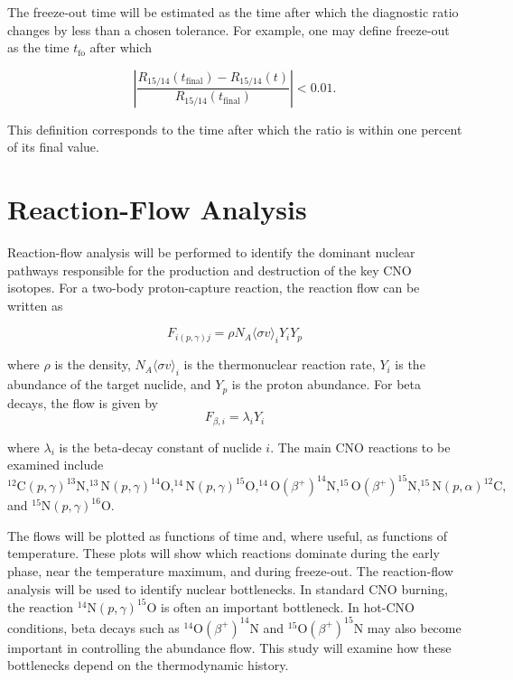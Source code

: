 The freeze-out time will be estimated as the time after which the diagnostic ratio changes by less than a chosen tolerance. For example, one may define freeze-out as the time $t_{\mathrm{fo}}$ after which

\[
\left|
\frac{R_{15/14}(t_{\mathrm{final}})-R_{15/14}(t)}
{R_{15/14}(t_{\mathrm{final}})}
\right|
< 0.01 .
\]

This definition corresponds to the time after which the ratio is within one percent of its final value.

\section{Reaction-Flow Analysis}

Reaction-flow analysis will be performed to identify the dominant nuclear pathways responsible for the production and destruction of the key CNO isotopes. For a two-body proton-capture reaction, the reaction flow can be written as

\begin{equation}
   F_{i(p,\gamma)j}
=
\rho N_A \langle \sigma v \rangle_i Y_i Y_p  
\label{eq:flow}
\end{equation}


where $\rho$ is the density, $N_A \langle \sigma v \rangle_i$ is the thermonuclear reaction rate, $Y_i$ is the abundance of the target nuclide, and $Y_p$ is the proton abundance. For beta decays, the flow is given by
\begin{equation}
    F_{\beta,i} = \lambda_i Y_i
    \label{eq:betaflows}
\end{equation}

where $\lambda_i$ is the beta-decay constant of nuclide $i$. The main CNO reactions to be examined include $^{12}\mathrm{C}(p,\gamma)^{13}\mathrm{N}, ^{13}\mathrm{N}(p,\gamma)^{14}\mathrm{O}, ^{14}\mathrm{N}(p,\gamma)^{15}\mathrm{O}, ^{14}\mathrm{O}(\beta^+)^{14}\mathrm{N}, ^{15}\mathrm{O}(\beta^+)^{15}\mathrm{N}, ^{15}\mathrm{N}(p,\alpha)^{12}\mathrm{C}, $ and $^{15}\mathrm{N}(p,\gamma)^{16}\mathrm{O}. $

The flows will be plotted as functions of time and, where useful, as functions of temperature. These plots will show which reactions dominate during the early phase, near the temperature maximum, and during freeze-out. The reaction-flow analysis will be used to identify nuclear bottlenecks. In standard CNO burning, the reaction $^{14}\mathrm{N}(p,\gamma)^{15}\mathrm{O}$ is often an important bottleneck. In hot-CNO conditions, beta decays such as $^{14}\mathrm{O}(\beta^+)^{14}\mathrm{N}$ and $^{15}\mathrm{O}(\beta^+)^{15}\mathrm{N}$ may also become important in controlling the abundance flow. This study will examine how these bottlenecks depend on the thermodynamic history.

